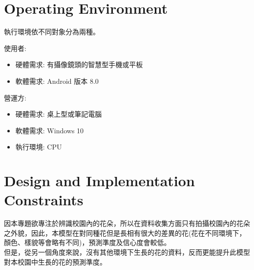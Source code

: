 \documentclass{scrreprt}
\begin{document}
\section{Operating Environment}
\begin{CJK}{UTF8}{bkai}
執行環境依不同對象分為兩種。 \\
\end{CJK}

\begin{CJK}{UTF8}{bkai}
使用者:
\end{CJK}
\begin{itemize}
\item
\begin{CJK}{UTF8}{bkai}
硬體需求:  有攝像鏡頭的智慧型手機或平板 
\end{CJK}
\item
\begin{CJK}{UTF8}{bkai}
軟體需求: Android  版本 8.0 
\end{CJK}
\end{itemize}

\begin{CJK}{UTF8}{bkai}
營運方: 
\end{CJK}
\begin{itemize}
\item
\begin{CJK}{UTF8}{bkai}
硬體需求:  桌上型或筆記電腦
\end{CJK}
\item
\begin{CJK}{UTF8}{bkai}
軟體需求:  Windows 10 
\end{CJK}
\item
\begin{CJK}{UTF8}{bkai}
執行環境: CPU
\end{CJK}
\end{itemize}

\section{Design and Implementation Constraints}
\begin{CJK}{UTF8}{bkai}
	因本專題欲專注於辨識校園內的花朵，所以在資料收集方面只有拍攝校園內的花朵之外貌，因此，本模型在對同種花但是長相有很大的差異的花(花在不同環境下，顏色、樣貌等會略有不同)，預測準度及信心度會較低。 \\[6pt]
	但是，從另一個角度來說，沒有其他環境下生長的花的資料，反而更能提升此模型對本校園中生長的花的預測準度。
\end{CJK}
\end{document}
